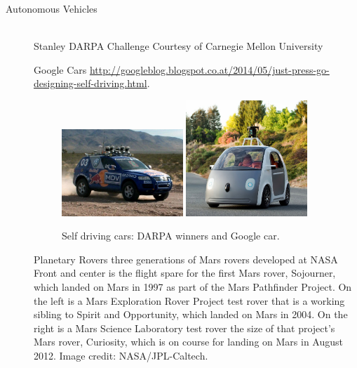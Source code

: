 \begin{description}
\item[Autonomous Vehicles]\hfill \\
Stanley \citep{stanley}
DARPA Challenge Courtesy of Carnegie Mellon University

Google Cars \url{http://googleblog.blogspot.co.at/2014/05/just-press-go-designing-self-driving.html}.

\begin{figure}[thpb]
	  \myfloatalign
      \footnotesize
      \centering
    \subfloat
    {  \label{fig:fig_stanley}
        \includegraphics[width=0.45\textwidth,height=0.2\textheight]{figures/fig_stanley.jpg}
    }    
    \subfloat
    {  \label{fig:fig_googlecar}
       \includegraphics[width=0.45\textwidth,height=0.2\textheight]{figures/fig_googlecar.jpg}
    }
   \caption[Selfdriving car]{Self driving cars: DARPA winners and Google car.}
   \label{fig:fig_auto}
\end{figure}

Planetary Rovers
three generations of Mars rovers developed at NASA
Front and center is the flight spare for the first Mars rover, Sojourner, which landed on Mars in 1997 as part of the Mars Pathfinder Project. On the left is a Mars Exploration Rover Project test rover that is a working sibling to Spirit and Opportunity, which landed on Mars in 2004. On the right is a Mars Science Laboratory test rover the size of that project's Mars rover, Curiosity, which is on course for landing on Mars in August 2012.
Image credit: NASA/JPL-Caltech.
\cite{PavoneAcikmese2014rover}


\end{description}
